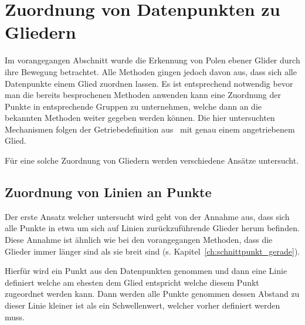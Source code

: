 
\chapter{Zuordnung von Datenpunkten zu Gliedern} \label{ch:gruppierung_von_datenpunkten}


Im vorangegangen Abschnitt wurde die Erkennung von Polen ebener Glider durch ihre Bewegung betrachtet.
Alle Methoden gingen jedoch davon aus, dass sich alle Datenpunkte einem Glied zuordnen lassen.
Es ist entsprechend notwendig bevor man die bereits besprochenen Methoden anwenden kann eine Zuordnung der Punkte in entsprechende Gruppen zu unternehmen, welche dann an die bekannten Methoden weiter gegeben werden können.
Die hier untersuchten Mechanismen folgen der Getriebedefinition aus~\cite[G167]{Grote2014} mit genau einem angetriebenem Glied.

Für eine solche Zuordnung von Gliedern werden verschiedene Ansätze untersucht.

\section{Zuordnung von Linien an Punkte}

Der erste Ansatz welcher untersucht wird geht von der Annahme aus, dass sich alle Punkte in etwa um sich auf Linien zurückzuführende Glieder herum befinden.
Diese Annahme ist ähnlich wie bei den vorangegangen Methoden, dass die Glieder immer länger sind als sie breit sind (s. Kapitel~\ref{ch:schnittpunkt_gerade}).

Hierfür wird ein Punkt aus den Datenpunkten genommen und dann eine Linie definiert welche am ehesten dem Glied entspricht welche diesem Punkt zugeordnet werden kann.
Dann werden alle Punkte genommen dessen Abstand zu dieser Linie kleiner ist als ein Schwellenwert, welcher vorher definiert werden muss.

